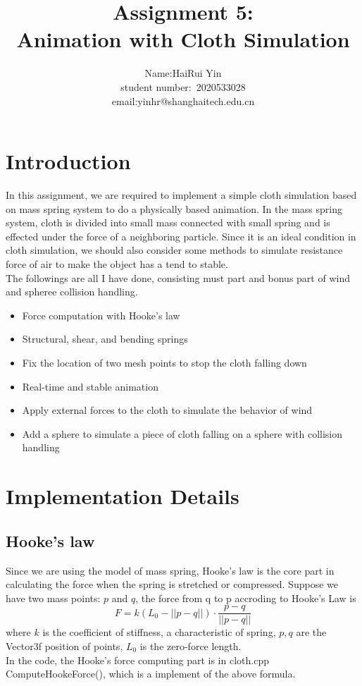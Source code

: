 \documentclass[acmtog]{acmart}
\title{Assignment 5:\\ {Animation with Cloth Simulation}}
\author{Name:\quad HaiRui Yin  \\ student number:\ 2020533028
\\email:\quad yinhr@shanghaitech.edu.cn}
\begin{document}
\maketitle

\vspace*{2 ex}

\section{Introduction}
In this assignment, we are required to implement a simple cloth simulation based on mass spring system to do a physically based animation. In the mass spring system, cloth is divided into small mass connected with small spring and is effected under the force of a neighboring particle. Since it is an ideal condition in cloth simulation, we should also consider some methods to simulate resistance force of air to make the object has a tend to stable.\\
The followings are all I have done, consisting must part and bonus part of wind and spheree collision handling.
\begin{itemize}
\item Force computation with Hooke's law
\item Structural, shear, and bending springs
\item Fix the location of two mesh points to stop the cloth falling down
\item Real-time and stable animation
\item Apply external forces to the cloth to simulate the behavior of wind
\item Add a sphere to simulate a piece of cloth falling on a sphere with collision handling
\end{itemize}
\section{Implementation Details}
\subsection{Hooke's law}
Since we are using the model of mass spring, Hooke's law is the core part in calculating the force when the spring is stretched or compressed. Suppose we have two mass points: $p$ and $q$, the force from q to p accroding to Hooke's Law is
$$F=k(L_0-||p-q||)\cdot\frac{p-q}{||p-q||}$$
where $k$ is the coefficient of stiffness, a characteristic of spring, $p,q$ are the Vector3f position of points, $L_0$ is the zero-force length.\\
In the code, the Hooke's force computing part is in cloth.cpp ComputeHookeForce(), which is a implement of the above formula.
\end{document}
